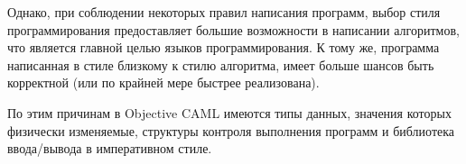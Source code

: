 Однако, при соблюдении некоторых правил написания программ, выбор стиля
программирования предоставляет большие возможности в написании алгоритмов, что
является главной целью языков программирования. К тому же, программа написанная
в стиле близкому к стилю алгоритма, имеет больше шансов быть корректной (или по
крайней мере быстрее реализована).

По этим причинам в Objective CAML имеются типы данных, значения которых
физически изменяемые, структуры контроля выполнения программ и библиотека
ввода/вывода в императивном стиле.

